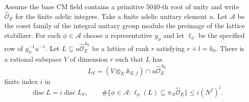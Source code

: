 \begin{lemma}
\label{lem:b-vanishing-rows}
\emitthmsource
Assume the base CM field contains a primitive $5040$-th root of unity and write $\widehat{\mathcal O}_E$ for the finite adelic integers.
Take a finite adelic unitary element $u$. Let $\mathcal A$ be the coset family of the integral unitary group modulo the preimage of the lattice stabilizer.
For each $\phi\in\mathcal A$ choose a representative $y_\phi$ and let $\ell_\phi$ be the specified row of $y_\phi^{-1}u^{-1}$.
Let $L\subseteq u\widehat{\mathcal O}_E^{\,k_0}$ be a lattice of rank $r$ satisfying $r+l=k_0$.
There is a rational subspace $V$ of dimension $r$ such that $L$ has
\[
 L_V=(V\otimes_E\mathbb A_{E,f})\cap u\widehat{\mathcal O}_E^{\,k_0}
\]
finite index $i$ in
\[
 \operatorname{disc}L=i\operatorname{disc}L_V,\qquad
 \#\{\phi\in\mathcal A:\ell_\phi(L)\subseteq\pi_N\widehat{\mathcal O}_E\}
 \le i(N^f)^l.
\]
\end{lemma}

